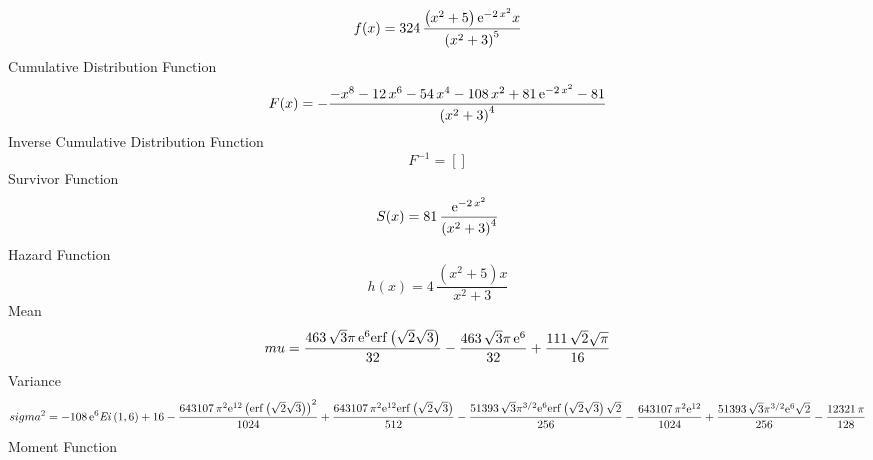 \documentclass[12pt]{article}
\begin{document}
$$  f(x)=324\,{\frac { \left( {x}^{2}+5 \right) {{\rm e}^{-2\,{x}^{2}}}x}{
 \left( {x}^{2}+3 \right) ^{5}}}
$$Cumulative Distribution Function  
 $$F(x)=-{\frac {-{x}^{8}-12\,{x}^{6}-54\,{x}^{4}-108\,{x}^{2}+81\,{{\rm e}^{-
2\,{x}^{2}}}-81}{ \left( {x}^{2}+3 \right) ^{4}}}
$$ Inverse Cumulative Distribution Function 
  $$F^{-1} = []
$$Survivor Function 
 $$ S(x)=81\,{\frac {{{\rm e}^{-2\,{x}^{2}}}}{ \left( {x}^{2}+3 \right) ^{4}}}
$$ Hazard Function 
 $$ h(x)=4\,{\frac { \left( {x}^{2}+5 \right) x}{{x}^{2}+3}}
$$Mean 
 $$ mu={\frac {463\,\sqrt {3}\pi\,{{\rm e}^{6}}{\rm erf} \left(\sqrt {2}
\sqrt {3}\right)}{32}}-{\frac {463\,\sqrt {3}\pi\,{{\rm e}^{6}}}{32}}+
{\frac {111\,\sqrt {2}\sqrt {\pi}}{16}}
$$ Variance 
 $$ sigma^2 = -108\,{{\rm e}^{6}}{\it Ei} \left( 1,6 \right) +16-{\frac {643107\,{
\pi}^{2}{{\rm e}^{12}} \left( {\rm erf} \left(\sqrt {2}\sqrt {3}
\right) \right) ^{2}}{1024}}+{\frac {643107\,{\pi}^{2}{{\rm e}^{12}}
{\rm erf} \left(\sqrt {2}\sqrt {3}\right)}{512}}-{\frac {51393\,\sqrt 
{3}{\pi}^{3/2}{{\rm e}^{6}}{\rm erf} \left(\sqrt {2}\sqrt {3}\right)
\sqrt {2}}{256}}-{\frac {643107\,{\pi}^{2}{{\rm e}^{12}}}{1024}}+{
\frac {51393\,\sqrt {3}{\pi}^{3/2}{{\rm e}^{6}}\sqrt {2}}{256}}-{
\frac {12321\,\pi}{128}}
$$Moment Function 
\end{document}
